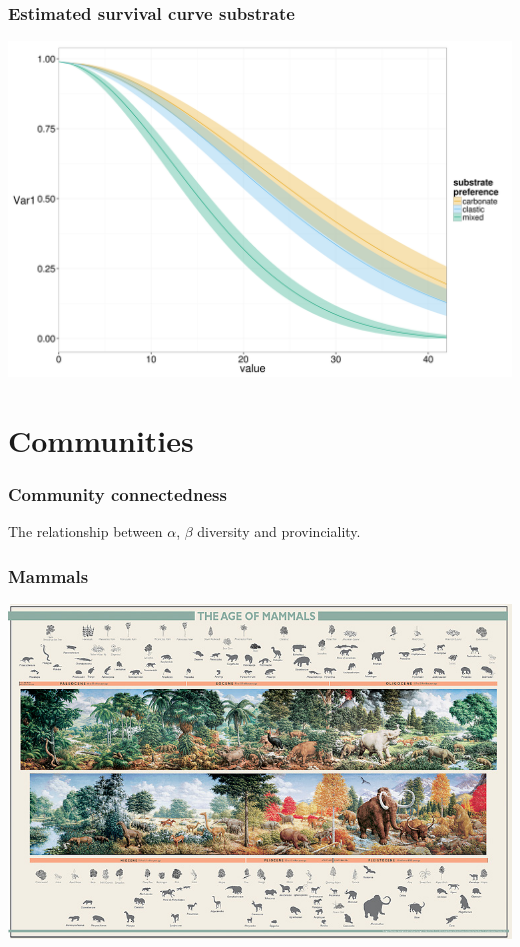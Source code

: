 \documentclass{beamer}
\begin{document}
\begin{frame}
  \frametitle{Estimated survival curve substrate}
  \begin{center}
    \includegraphics[height = 0.8\textheight, width = \textwidth, keepaspectratio = true]{figure/aff}
  \end{center}
\end{frame}


\section{Communities}

\begin{frame}
  \frametitle{Community connectedness}
  \begin{definition}
    The relationship between \(\alpha\), \(\beta\) diversity and provinciality.
  \end{definition}
\end{frame}

\begin{frame}
  \frametitle{Mammals}
  \includegraphics[height = 0.9\textheight, width = \textwidth, keepaspectratio = true]{figure/aom}

  \tiny{}
\end{frame}
\end{document}
